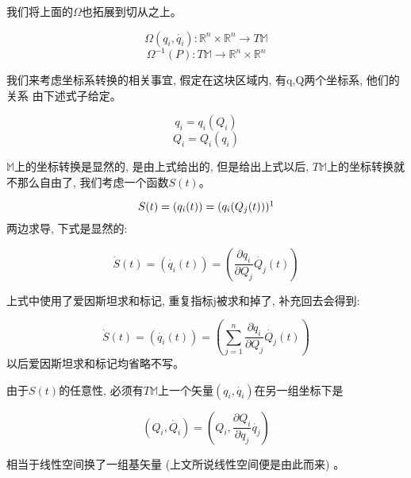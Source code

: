 \documentclass{ctexart}
\numberwithin{equation}{subsection}
\numberwithin{theorem}{subsection}
\numberwithin{definition}{subsection}
\numberwithin{proof}{subsection}
\numberwithin{lemma}{subsection}
\numberwithin{example}{subsection}
\numberwithin{remark}{subsection}
\numberwithin{corollary}{subsection}
\numberwithin{exercise}{subsection}
\numberwithin{problem}{subsection}
\numberwithin{question}{section}
\numberwithin{method}{subsection}
\begin{document}
    我们将上面的$\Omega$也拓展到切从之上。

    \begin{equation}
        \Omega(q_i,\dot{q_i}):\mathbb{R}^n\times\mathbb{R}^n \rightarrow T\mathbb{M}
    \end{equation}
    \begin{equation}
        \Omega^{-1}(P):T\mathbb{M} \rightarrow \mathbb{R}^n\times\mathbb{R}^n
    \end{equation}

    我们来考虑坐标系转换的相关事宜, 假定在这块区域内, 有q,Q两个坐标系, 他们的关系
    由下述式子给定。

    \begin{equation}
        q_i = q_i(Q_i)
    \end{equation}
    \begin{equation}
        Q_i = Q_i(q_i)
    \end{equation}

    $\mathbb{M}$上的坐标转换是显然的, 是由上式给出的, 但是给出上式以后, 
    $T\mathbb{M}$上的坐标转换就不那么自由了, 我们考虑一个函数$S(t)$。

    \begin{equation}
        S(t) = (q_i(t)) = (q_i(Q_j(t)))
        \footnotemark
    \end{equation}
    两边求导, 下式是显然的: 

    \begin{equation}
        \dot{S}(t) = (\dot{q_i}(t)) = (\frac{\partial q_i}{\partial Q_j}\dot{Q_j}(t))
    \end{equation}

    上式中使用了爱因斯坦求和标记, 重复指标j被求和掉了, 补充回去会得到:

    \begin{equation}
        \dot{S}(t) = (\dot{q_i}(t)) = (\sum_{j=1}^n\frac{\partial q_i}{\partial Q_j}\dot{Q_j}(t))
    \end{equation}
    以后爱因斯坦求和标记均省略不写。

    由于$S(t)$的任意性, 必须有$T\mathbb{M}$上一个矢量$(q_i,\dot{q_i})$在另一组坐标下是

    \begin{equation}
        (Q_i,\dot{Q_i}) = (Q_i,\frac{\partial Q_i}{\partial q_j}\dot{q_j})
    \end{equation}

    相当于线性空间换了一组基矢量 (上文所说线性空间便是由此而来) 。

\end{document}
